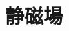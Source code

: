 \documentclass[../../../all/physics-standard_answers_all.tex]{subfiles}
\begin{document}
\section{静磁場}
\end{document}
